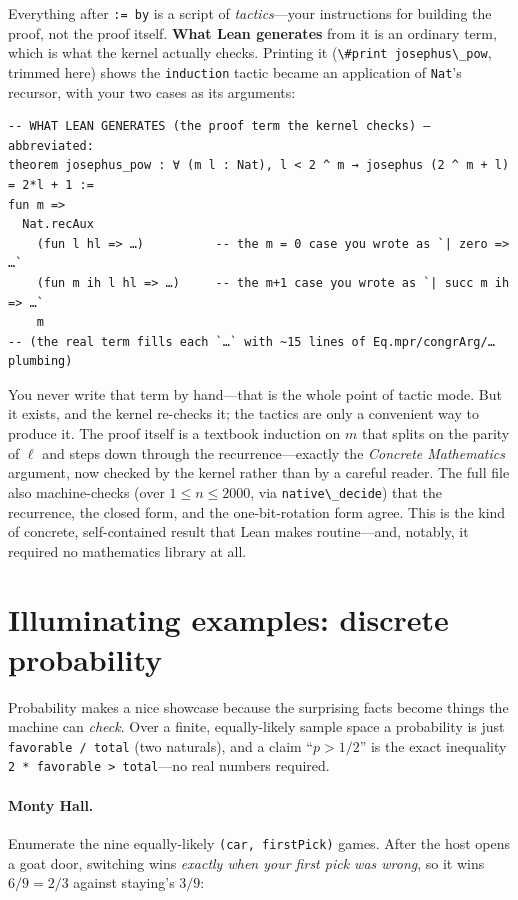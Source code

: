 \documentclass[11pt]{article}
\newcommand{\code}[1]{\lstinline[basicstyle=\ttfamily]|#1|}
\begin{document}
\noindent Everything after \code{:= by} is a script of \emph{tactics}---your
instructions for building the proof, not the proof itself. \textbf{What Lean
generates} from it is an ordinary term, which is what the kernel actually
checks. Printing it (\code{\#print josephus\_pow}, trimmed here) shows the
\code{induction} tactic became an application of \code{Nat}'s recursor, with your
two cases as its arguments:

\begin{lstlisting}
-- WHAT LEAN GENERATES (the proof term the kernel checks) — abbreviated:
theorem josephus_pow : ∀ (m l : Nat), l < 2 ^ m → josephus (2 ^ m + l) = 2*l + 1 :=
fun m =>
  Nat.recAux
    (fun l hl => …)          -- the m = 0 case you wrote as `| zero => …`
    (fun m ih l hl => …)     -- the m+1 case you wrote as `| succ m ih => …`
    m
-- (the real term fills each `…` with ~15 lines of Eq.mpr/congrArg/… plumbing)
\end{lstlisting}

\noindent You never write that term by hand---that is the whole point of tactic
mode. But it exists, and the kernel re-checks it; the tactics are only a
convenient way to produce it. The proof itself is a textbook induction on $m$
that splits on the parity of $\ell$ and steps down through the recurrence---exactly
the \emph{Concrete Mathematics} argument, now checked by the kernel rather than
by a careful reader.
The full file also machine-checks (over $1 \le n \le 2000$, via
\code{native\_decide}) that the recurrence, the closed form, and the
one-bit-rotation form agree. This is the kind of concrete, self-contained result
that Lean makes routine---and, notably, it required no mathematics library at
all.

\section{Illuminating examples: discrete probability}\label{sec:prob}
Probability makes a nice showcase because the surprising facts become things the
machine can \emph{check}. Over a finite, equally-likely sample space a
probability is just \code{favorable / total} (two naturals), and a claim
``$p > 1/2$'' is the exact inequality \code{2 * favorable > total}---no real
numbers required.

\paragraph{Monty Hall.} Enumerate the nine equally-likely \code{(car, firstPick)}
games. After the host opens a goat door, switching wins \emph{exactly when your
first pick was wrong}, so it wins $6/9 = 2/3$ against staying's $3/9$:
\end{document}
